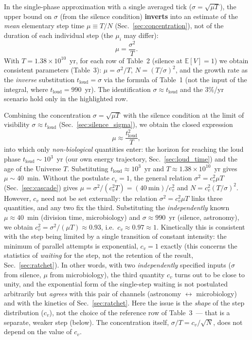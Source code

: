 \documentclass[11pt,a4paper]{article}
\begin{document}
In the single-phase approximation with a single averaged tick ($\sigma = \sqrt{\mu T}$), the upper bound on $\sigma$ (from the silence condition) \textbf{inverts} into an estimate of the \emph{mean} elementary step time $\mu \equiv T/N$ (Sec.~\ref{sec:concentration}), not of the duration of each individual step (the $\mu_i$ may differ):
\begin{equation}
\boxed{\mu = \frac{\sigma^2}{T}.}
\end{equation}
With $T = 1.38 \times 10^{10}$~yr, for each row of Table~2 (silence at $\mathbb{E}[V]=1$) we obtain consistent parameters (Table~3): $\mu=\sigma^2/T$, $N=(T/\sigma)^2$, and the growth rate as the \emph{inverse} substitution $t_{\mathrm{loud}}=\sigma$ via the formula of Table~1 (not the input of the integral, where $t_{\mathrm{loud}}=990$~yr). The identification $\sigma \approx t_{\mathrm{loud}}$ and the $3\%$/yr scenario hold only in the highlighted row.

Combining the concentration $\sigma = \sqrt{\mu T}$ with the silence condition at the limit of visibility $\sigma \approx t_{\mathrm{loud}}$ (Sec.~\ref{sec:silence_sigma}), we obtain the closed expression
\begin{equation}
\mu \approx \frac{t_{\mathrm{loud}}^{2}}{T},
\end{equation}
into which only \emph{non-biological} quantities enter: the horizon for reaching the loud phase $t_{\mathrm{loud}} \sim 10^3$~yr (our own energy trajectory, Sec.~\ref{sec:loud_time}) and the age of the Universe $T$. Substituting $t_{\mathrm{loud}} \approx 10^3$~yr and $T \approx 1.38 \times 10^{10}$~yr gives $\mu \sim 40$~min. Without the postulate $c_v = 1$, the general relation $\sigma^2 = c_v^2\mu T$ (Sec.~\ref{sec:cascade}) gives $\mu = \sigma^2/(c_v^2 T) = (40~\text{min})/c_v^2$ and $N = c_v^2 (T/\sigma)^2$. However, $c_v$ need not be set externally: the relation $\sigma^2 = c_v^2\mu T$ links three quantities, and any two fix the third. Substituting the \emph{independently} known $\mu \approx 40$~min (division time, microbiology) and $\sigma \approx 990$~yr (silence, astronomy), we obtain $c_v^2 = \sigma^2/(\mu T) \approx 0.93$, i.e.\ $c_v \approx 0.97 \approx 1$. Kinetically this is consistent with the step being limited by a single transition of constant intensity: the minimum of parallel attempts is exponential, $c_v=1$ exactly (this concerns the statistics of \emph{waiting} for the step, not the retention of the result, Sec.~\ref{sec:ratchet}). In other words, with two \emph{independently} specified inputs ($\sigma$ from silence, $\mu$ from microbiology), the third quantity $c_v$ turns out to be close to unity, and the exponential form of the single-step waiting is not postulated arbitrarily but \emph{agrees} with this pair of channels (astronomy $\leftrightarrow$ microbiology) and with the kinetics of Sec.~\ref{sec:ratchet}. Here the issue is the \emph{shape} of the step distribution ($c_v$), not the choice of the reference row of Table~3~--- that is a separate, weaker step (below). The concentration itself, $\sigma/T = c_v/\sqrt{N}$, does not depend on the value of $c_v$.
\end{document}
